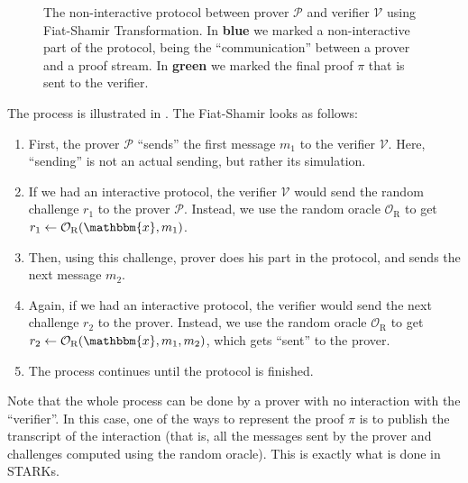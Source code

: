 \documentclass[../../book.tex]{subfiles}
\begin{document}
\begin{figure}[H]
{
    }

    \caption{The non-interactive protocol between prover $\mathcal{P}$ and verifier $\mathcal{V}$ using Fiat-Shamir Transformation. In \textcolor{blue!90!black}{\textbf{blue}} we marked a non-interactive part of the protocol, being the ``communication'' between a prover and a proof stream. In \textcolor{green!50!black}{\textbf{green}} we marked the final proof $\pi$ that is sent to the verifier.}
    \label{fig:fiat-shamir}
\end{figure}

The process is illustrated in . The Fiat-Shamir looks as follows:
\begin{enumerate}
    \item First, the prover $\mathcal{P}$ ``sends'' the first message $m_1$ to
    the verifier $\mathcal{V}$. Here, ``sending'' is not an actual sending, but
    rather its simulation.
    \item If we had an interactive protocol, the verifier $\mathcal{V}$ would
    send the random challenge $r_1$ to the prover $\mathcal{P}$. Instead, we use
    the random oracle $\mathcal{O}_{\text{R}}$ to get $r_1 \gets
    \mathcal{O}_{\text{R}}(\mathbbm{x},m_1)$.
    \item Then, using this challenge, prover does his part in the protocol, and
    sends the next message $m_2$. 
    \item Again, if we had an interactive protocol, the verifier would send the
    next challenge $r_2$ to the prover. Instead, we use the random oracle
    $\mathcal{O}_{\text{R}}$ to get $r_2 \gets
    \mathcal{O}_{\text{R}}(\mathbbm{x},m_1,m_2)$, which gets ``sent'' to the prover.
    \item The process continues until the protocol is finished.
\end{enumerate}

Note that the whole process can be done by a prover with no interaction with the
``verifier''. In this case, one of the ways to represent the proof $\pi$ is to
publish the transcript of the interaction (that is, all the messages sent by the
prover and challenges computed using the random oracle). This is exactly what is
done in STARKs.
\end{document}
